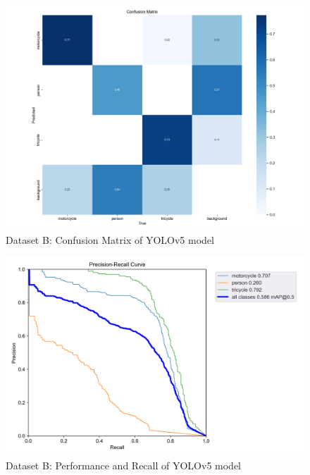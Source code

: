 \documentclass[conference]{IEEEtran}
\begin{document}
		\begin{figure}[h]
			\centering
			\includegraphics[width=\columnwidth]{Figures/dataset_b/b_confusion_matrix.png}
			\caption{Dataset B: Confusion Matrix of YOLOv5 model}
			\label{fig:mtpDatasetYolov5LargeWeight}
		\end{figure}

		\begin{figure}[h]
			\centering
			\includegraphics[width=\columnwidth]{Figures/dataset_b/PR_curve.png}
			\caption{Dataset B: Performance and Recall of YOLOv5 model}
			\label{fig:mtpDatasetYolov5LargeWeightPRCurve}
		\end{figure}
\end{document}
